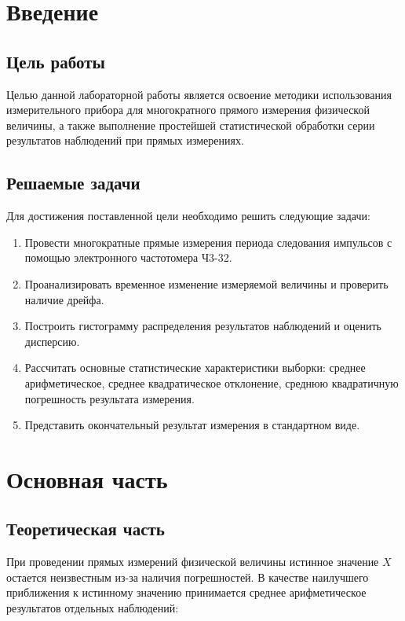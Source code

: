 \section{Введение}

\subsection{Цель работы}

Целью данной лабораторной работы является освоение методики использования измерительного прибора для многократного прямого измерения физической величины, а также выполнение простейшей статистической обработки серии результатов наблюдений при прямых измерениях.

\subsection{Решаемые задачи}

Для достижения поставленной цели необходимо решить следующие задачи:

\begin{enumerate}
    \item Провести многократные прямые измерения периода следования импульсов с помощью электронного частотомера Ч3-32.
    \item Проанализировать временное изменение измеряемой величины и проверить наличие дрейфа.
    \item Построить гистограмму распределения результатов наблюдений и оценить дисперсию.
    \item Рассчитать основные статистические характеристики выборки: среднее арифметическое, среднее квадратическое отклонение, среднюю квадратичную погрешность результата измерения.
    \item Представить окончательный результат измерения в стандартном виде.
\end{enumerate}

\section{Основная часть}

\subsection{Теоретическая часть}

При проведении прямых измерений физической величины истинное значение $X$ остается неизвестным из-за наличия погрешностей. В качестве наилучшего приближения к истинному значению принимается среднее арифметическое результатов отдельных наблюдений:

